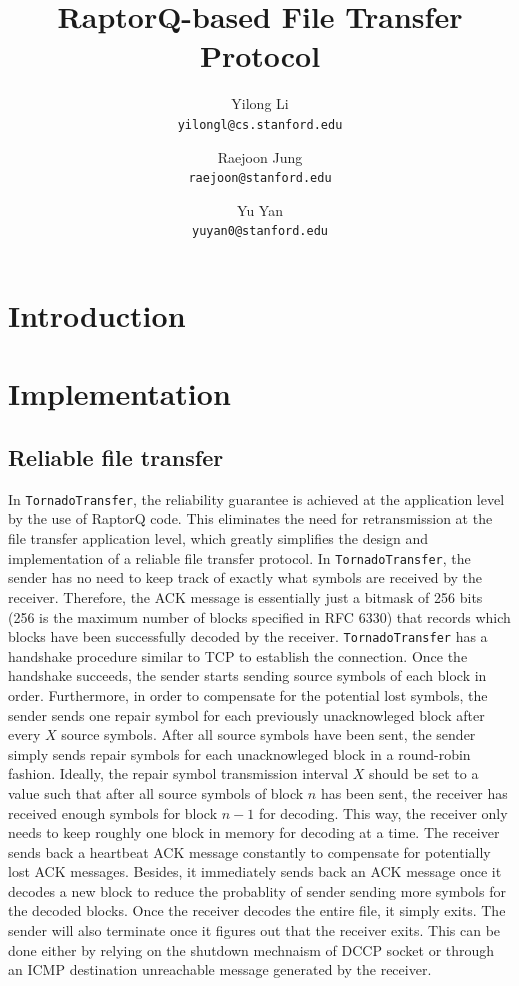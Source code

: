 \documentclass{sig-alternate-10pt}
\begin{document}
\title{RaptorQ-based File Transfer Protocol} 
\author{ 
Yilong Li\\
\texttt{yilongl@cs.stanford.edu} \and 
Raejoon Jung\\
\texttt{raejoon@stanford.edu} \and 
Yu Yan\\ 
\texttt{yuyan0@stanford.edu} 
}

\maketitle 

\section{Introduction}

\section{Implementation}

\subsection{Reliable file transfer}

In \texttt{TornadoTransfer}, the reliability guarantee is achieved at the application level by the use of RaptorQ code. This eliminates the need for retransmission at the file transfer application level, which greatly simplifies the design and implementation of a reliable file transfer protocol. In \texttt{TornadoTransfer}, the sender has no need to keep track of exactly what symbols are received by the receiver. Therefore, the ACK message is essentially just a bitmask of 256 bits (256 is the maximum number of blocks specified in RFC 6330) that records which blocks have been successfully decoded by the receiver. \texttt{TornadoTransfer} has a handshake procedure similar to TCP to establish the connection. Once the handshake succeeds, the sender starts sending source symbols of each block in order. Furthermore, in order to compensate for the potential lost symbols, the sender sends one repair symbol for each previously unacknowleged block after every $X$ source symbols. After all source symbols have been sent, the sender simply sends repair symbols for each unacknowleged block in a round-robin fashion. Ideally, the repair symbol transmission interval $X$ should be set to a value such that after all source symbols of block $n$ has been sent, the receiver has received enough symbols for block $n-1$ for decoding. This way, the receiver only needs to keep roughly one block in memory for decoding at a time. The receiver sends back a heartbeat ACK message constantly to compensate for potentially lost ACK messages. Besides, it immediately sends back an ACK message once it decodes a new block to reduce the probablity of sender sending more symbols for the decoded blocks. Once the receiver decodes the entire file, it simply exits. The sender will also terminate once it figures out that the receiver exits. This can be done either by relying on the shutdown mechnaism of DCCP socket or through an ICMP destination unreachable message generated by the receiver.
\end{document}
